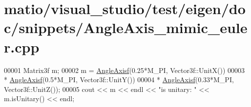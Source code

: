 \hypertarget{matio_2visual__studio_2test_2eigen_2doc_2snippets_2_angle_axis__mimic__euler_8cpp_source}{}\section{matio/visual\+\_\+studio/test/eigen/doc/snippets/\+Angle\+Axis\+\_\+mimic\+\_\+euler.cpp}
\label{matio_2visual__studio_2test_2eigen_2doc_2snippets_2_angle_axis__mimic__euler_8cpp_source}

\begin{DoxyCode}
00001 Matrix3f m;
00002 m = \hyperlink{group___geometry___module_gadc7128416da41ca99bb8af814b78599e}{AngleAxisf}(0.25*M\_PI, Vector3f::UnitX())
00003   * \hyperlink{group___geometry___module_gadc7128416da41ca99bb8af814b78599e}{AngleAxisf}(0.5*M\_PI,  Vector3f::UnitY())
00004   * \hyperlink{group___geometry___module_gadc7128416da41ca99bb8af814b78599e}{AngleAxisf}(0.33*M\_PI, Vector3f::UnitZ());
00005 cout << m << endl << \textcolor{stringliteral}{"is unitary: "} << m.isUnitary() << endl;
\end{DoxyCode}
